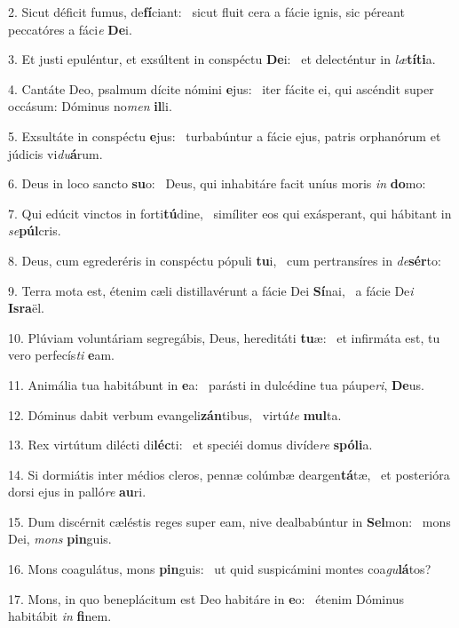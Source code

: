 2. Sicut déficit fumus, de\textbf{fí}ciant: \ast\  sicut fluit cera a fácie ignis, sic péreant peccatóres a fáci\textit{e} \textbf{De}i.\

3. Et justi epuléntur, et exsúltent in conspéctu \textbf{De}i: \ast\  et delecténtur in \textit{læ}\textbf{tí}\textbf{ti}a.\

4. Cantáte Deo, psalmum dícite nómini \textbf{e}jus: \ast\  iter fácite ei, qui ascéndit super occásum: Dóminus no\textit{men} \textbf{il}li.\

5. Exsultáte in conspéctu \textbf{e}jus: \ast\  turbabúntur a fácie ejus, patris orphanórum et júdicis vi\textit{du}\textbf{á}rum.\

6. Deus in loco sancto \textbf{su}o: \ast\  Deus, qui inhabitáre facit uníus moris \textit{in} \textbf{do}mo:\

7. Qui edúcit vinctos in forti\textbf{tú}dine, \ast\  simíliter eos qui exásperant, qui hábitant in \textit{se}\textbf{púl}cris.\

8. Deus, cum egrederéris in conspéctu pópuli \textbf{tu}i, \ast\  cum pertransíres in \textit{de}\textbf{sér}to:\

9. Terra mota est, étenim cæli distillavérunt a fácie Dei \textbf{Sí}nai, \ast\  a fácie De\textit{i} \textbf{Is}\textbf{ra}ël.\

10. Plúviam voluntáriam segregábis, Deus, hereditáti \textbf{tu}æ: \ast\  et infirmáta est, tu vero perfecís\textit{ti} \textbf{e}am.\

11. Animália tua habitábunt in \textbf{e}a: \ast\  parásti in dulcédine tua páupe\textit{ri}, \textbf{De}us.\

12. Dóminus dabit verbum evangeli\textbf{zán}tibus, \ast\  virtú\textit{te} \textbf{mul}ta.\

13. Rex virtútum dilécti di\textbf{léc}ti: \ast\  et speciéi domus divíde\textit{re} \textbf{spó}\textbf{li}a.\

14. Si dormiátis inter médios cleros, pennæ colúmbæ deargen\textbf{tá}tæ, \ast\  et posterióra dorsi ejus in palló\textit{re} \textbf{au}ri.\

15. Dum discérnit cæléstis reges super eam, nive dealbabúntur in \textbf{Sel}mon: \ast\  mons Dei, \textit{mons} \textbf{pin}guis.\

16. Mons coagulátus, mons \textbf{pin}guis: \ast\  ut quid suspicámini montes coa\textit{gu}\textbf{lá}tos?\

17. Mons, in quo beneplácitum est Deo habitáre in \textbf{e}o: \ast\  étenim Dóminus habitábit \textit{in} \textbf{fi}nem.\

